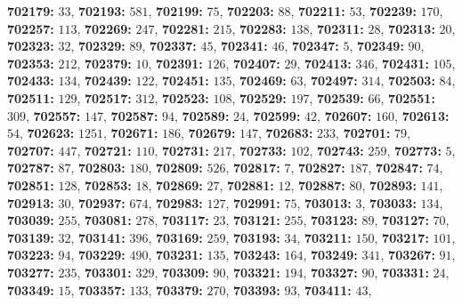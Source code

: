 \textsf{\bfseries 702179:} $33$, \textsf{\bfseries 702193:} $581$, \textsf{\bfseries 702199:} $75$, \textsf{\bfseries 702203:} $88$, \textsf{\bfseries 702211:} $53$, \textsf{\bfseries 702239:} $170$, \textsf{\bfseries 702257:} $113$, \textsf{\bfseries 702269:} $247$, \textsf{\bfseries 702281:} $215$, \textsf{\bfseries 702283:} $138$, \textsf{\bfseries 702311:} $28$, \textsf{\bfseries 702313:} $20$, \textsf{\bfseries 702323:} $32$, \textsf{\bfseries 702329:} $89$, \textsf{\bfseries 702337:} $45$, \textsf{\bfseries 702341:} $46$, \textsf{\bfseries 702347:} $5$, \textsf{\bfseries 702349:} $90$, \textsf{\bfseries 702353:} $212$, \textsf{\bfseries 702379:} $10$, \textsf{\bfseries 702391:} $126$, \textsf{\bfseries 702407:} $29$, \textsf{\bfseries 702413:} $346$, \textsf{\bfseries 702431:} $105$, \textsf{\bfseries 702433:} $134$, \textsf{\bfseries 702439:} $122$, \textsf{\bfseries 702451:} $135$, \textsf{\bfseries 702469:} $63$, \textsf{\bfseries 702497:} $314$, \textsf{\bfseries 702503:} $84$, \textsf{\bfseries 702511:} $129$, \textsf{\bfseries 702517:} $312$, \textsf{\bfseries 702523:} $108$, \textsf{\bfseries 702529:} $197$, \textsf{\bfseries 702539:} $66$, \textsf{\bfseries 702551:} $309$, \textsf{\bfseries 702557:} $147$, \textsf{\bfseries 702587:} $94$, \textsf{\bfseries 702589:} $24$, \textsf{\bfseries 702599:} $42$, \textsf{\bfseries 702607:} $160$, \textsf{\bfseries 702613:} $54$, \textsf{\bfseries 702623:} $1251$, \textsf{\bfseries 702671:} $186$, \textsf{\bfseries 702679:} $147$, \textsf{\bfseries 702683:} $233$, \textsf{\bfseries 702701:} $79$, \textsf{\bfseries 702707:} $447$, \textsf{\bfseries 702721:} $110$, \textsf{\bfseries 702731:} $217$, \textsf{\bfseries 702733:} $102$, \textsf{\bfseries 702743:} $259$, \textsf{\bfseries 702773:} $5$, \textsf{\bfseries 702787:} $87$, \textsf{\bfseries 702803:} $180$, \textsf{\bfseries 702809:} $526$, \textsf{\bfseries 702817:} $7$, \textsf{\bfseries 702827:} $187$, \textsf{\bfseries 702847:} $74$, \textsf{\bfseries 702851:} $128$, \textsf{\bfseries 702853:} $18$, \textsf{\bfseries 702869:} $27$, \textsf{\bfseries 702881:} $12$, \textsf{\bfseries 702887:} $80$, \textsf{\bfseries 702893:} $141$, \textsf{\bfseries 702913:} $30$, \textsf{\bfseries 702937:} $674$, \textsf{\bfseries 702983:} $127$, \textsf{\bfseries 702991:} $75$, \textsf{\bfseries 703013:} $3$, \textsf{\bfseries 703033:} $134$, \textsf{\bfseries 703039:} $255$, \textsf{\bfseries 703081:} $278$, \textsf{\bfseries 703117:} $23$, \textsf{\bfseries 703121:} $255$, \textsf{\bfseries 703123:} $89$, \textsf{\bfseries 703127:} $70$, \textsf{\bfseries 703139:} $32$, \textsf{\bfseries 703141:} $396$, \textsf{\bfseries 703169:} $259$, \textsf{\bfseries 703193:} $34$, \textsf{\bfseries 703211:} $150$, \textsf{\bfseries 703217:} $101$, \textsf{\bfseries 703223:} $94$, \textsf{\bfseries 703229:} $490$, \textsf{\bfseries 703231:} $135$, \textsf{\bfseries 703243:} $164$, \textsf{\bfseries 703249:} $341$, \textsf{\bfseries 703267:} $91$, \textsf{\bfseries 703277:} $235$, \textsf{\bfseries 703301:} $329$, \textsf{\bfseries 703309:} $90$, \textsf{\bfseries 703321:} $194$, \textsf{\bfseries 703327:} $90$, \textsf{\bfseries 703331:} $24$, \textsf{\bfseries 703349:} $15$, \textsf{\bfseries 703357:} $133$, \textsf{\bfseries 703379:} $270$, \textsf{\bfseries 703393:} $93$, \textsf{\bfseries 703411:} $43$, 
